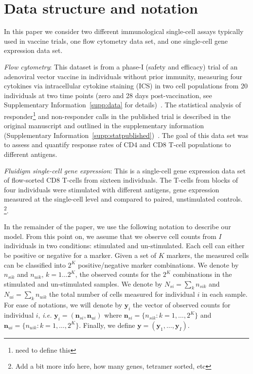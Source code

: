 \documentclass[11pt]{article}
\begin{document}
\section{Data structure and notation} 
In this paper we consider two different immunological single-cell assays typically used in vaccine trials, one flow cytometry data set, and one single-cell gene expression data set.

\textit{Flow cytometry}: This dataset is from a phase-I (safety and efficacy) trial of an adenoviral vector vaccine in individuals without prior immunity, measuring four cytokines via intracellular cytokine staining (ICS) in two cell populations from 20 individuals at two time points (zero and 28 days post-vaccination, see Supplementary Information~\ref{supp:data} for details)~\cite{Peiperl:2010ej}. The statistical analysis of responder\footnote{need to define this} and non-responder calls in the published trial is described in the original manuscript and outlined in the supplementary information (Supplementary Information~\ref{supp:statpublished})~\cite{Peiperl:2010ej}. The goal of this data set was to assess and quantify response rates of CD4 and CD8 T-cell populations to different antigens.

\textit{Fluidigm single-cell gene expression}: This is a single-cell gene expression data set of flow-sorted CD8 T-cells from sixteen individuals. The T-cells from blocks of four individuals were stimulated with different antigens, gene expression measured at the single-cell level and compared to paired, unstimulated controls. \footnote{Add a bit more info here, how many genes, tetramer sorted, etc}.

In the remainder of the paper, we use the following notation to describe our model. 
From this point on, we assume that we observe cell counts from $I$ individuals in two conditions: stimulated and un-stimulated. Each cell can either be positive or negative for a marker. Given a set of $K$ markers, the measured cells can be classified into $2^K$ positive/negative marker combinations. We denote by $n_{sik}$ and $n_{uik}$, $k=1\dots 2^K$, the observed counts for the $2^K$ combinations in the stimulated and un-stimulated samples. We denote by $N_{si}=\sum_k n_{sik}$ and $N_{ui}=\sum_k n_{uik}$ the total number of cells measured for individual $i$ in each sample. For ease of notations, we will denote by $\mathbf{y}_i$ the vector of observed counts for individual $i$, \textit{i.e.} $\mathbf{y}_{i}=(\mathbf{n}_{si}, \mathbf{n}_{ui})$ where $\mathbf{n}_{si}=\{n_{sik}: k=1,\dots,2^K\}$ and $\mathbf{n}_{ui}=\{n_{uik}: k=1,\dots,2^K\}$. Finally, we define $\mathbf{y}=(\mathbf{y}_1,\dots,\mathbf{y}_I)$.
\end{document}
